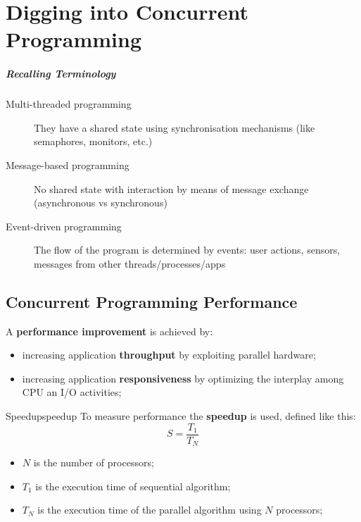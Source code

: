 \chapter{Digging into Concurrent Programming}\label{chap:cp_digging_into_concurrent_programming} %
\paragraph{Recalling Terminology}\label{par:cp_recalling_terminology} %
\begin{description}
    \item[Multi-threaded programming] They have a shared state using synchronisation mechanisms (like semaphores, monitors, etc.)
    \item[Message-based programming] No shared state with interaction by means of message exchange (asynchronous vs synchronous)
    \item[Event-driven programming] The flow of the program is determined by events: user actions, sensors, messages from other threads/processes/apps
\end{description}
%
\section{Concurrent Programming Performance}\label{sec:cp_concurrent_programming_performance} %
A \textbf{performance improvement} is achieved by:
\begin{itemize}
    \item increasing application \textbf{throughput} by exploiting parallel hardware;
    \item increasing application \textbf{responsiveness} by optimizing the interplay among CPU an I/O activities;
\end{itemize}
\begin{definition}{Speedup}{speedup}
    To measure performance the \textbf{speedup} is used, defined like this:
    \[
        S = \frac{T_1}{T_N}
    \]
    \begin{itemize}
        \item $N$ is the number of processors;
        \item $T_1$ is the execution time of sequential algorithm;
        \item $T_N$ is the execution time of the parallel algorithm using $N$ processors;
    \end{itemize}
\end{definition}
